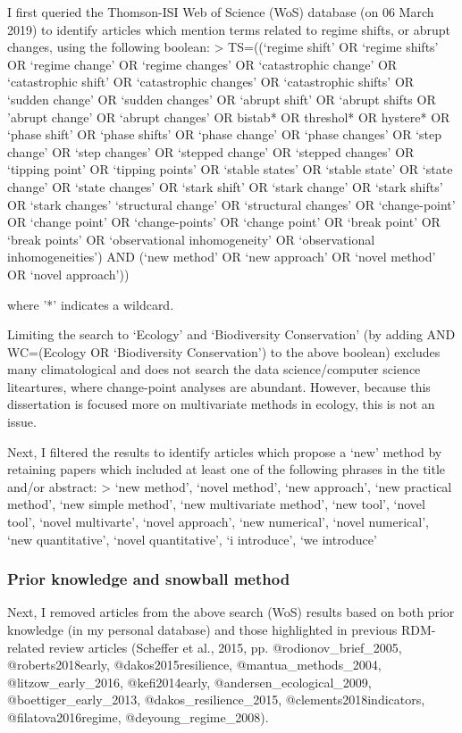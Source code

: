 \documentclass[12pt,twoside,openany]{reedthesis}
\begin{document}
I first queried the Thomson-ISI Web of Science (WoS) database (on 06 March 2019) to identify articles which mention terms related to regime shifts, or abrupt changes, using the following boolean:
\textgreater{} TS=((`regime shift' OR `regime shifts' OR `regime change' OR `regime changes' OR `catastrophic change' OR `catastrophic shift' OR `catastrophic changes' OR `catastrophic shifts' OR `sudden change' OR `sudden changes' OR `abrupt shift' OR `abrupt shifts OR 'abrupt change' OR `abrupt changes' OR bistab* OR threshol* OR hystere* OR `phase shift' OR `phase shifts' OR `phase change' OR `phase changes' OR `step change' OR `step changes' OR `stepped change' OR `stepped changes' OR `tipping point' OR `tipping points' OR `stable states' OR `stable state' OR `state change' OR `state changes' OR `stark shift' OR `stark change' OR `stark shifts' OR `stark changes' `structural change' OR `structural changes' OR `change-point' OR `change point' OR `change-points' OR `change point' OR `break point' OR `break points' OR `observational inhomogeneity' OR `observational inhomogeneities') AND (`new method' OR `new approach' OR `novel method' OR `novel approach'))

where '*' indicates a wildcard.

Limiting the search to `Ecology' and `Biodiversity Conservation' (by adding AND WC=(Ecology OR `Biodiversity Conservation') to the above boolean) excludes many climatological and does not search the data science/computer science liteartures, where change-point analyses are abundant. However, because this dissertation is focused more on multivariate methods in ecology, this is not an issue.

Next, I filtered the results to identify articles which propose a `new' method by retaining papers which included at least one of the following phrases in the title and/or abstract:
\textgreater{} `new method', `novel method', `new approach', `new practical method', `new simple method', `new multivariate method', `new tool', `novel tool', `novel multivarte', `novel approach', `new numerical', `novel numerical', `new quantitative', `novel quantitative', `i introduce', `we introduce'

\hypertarget{prior-knowledge-and-snowball-method}{%
\subsubsection{Prior knowledge and snowball method}\label{prior-knowledge-and-snowball-method}}

Next, I removed articles from the above search (WoS) results based on both prior knowledge (in my personal database) and those highlighted in previous RDM-related review articles (Scheffer et al., 2015, pp. @rodionov\_brief\_2005, @roberts2018early, @dakos2015resilience, @mantua\_methods\_2004, @litzow\_early\_2016, @kefi2014early, @andersen\_ecological\_2009, @boettiger\_early\_2013, @dakos\_resilience\_2015, @clements2018indicators, @filatova2016regime, @deyoung\_regime\_2008).
\end{document}
